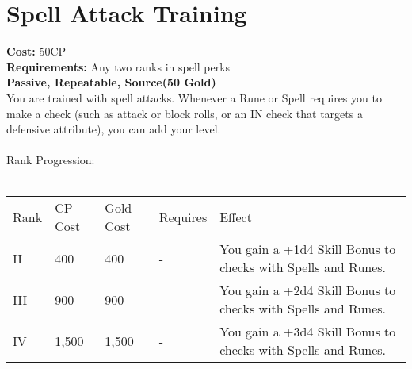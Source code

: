 \section{Spell Attack Training}\label{perk:spellAttackTraining}
\textbf{Cost:} 50CP\\
\textbf{Requirements:} Any two ranks in spell perks\\
\textbf{Passive, Repeatable, Source(50 Gold)}\\
You are trained with spell attacks.
Whenever a Rune or Spell requires you to make a check (such as attack or block rolls, or an IN check that targets a defensive attribute), you can add your level.\\
\\
Rank Progression:\\
\\
\begin{longtable}{l | l | l | l | p{9cm}}
	Rank & CP Cost & Gold Cost & Requires & Effect\\
	II & 400 & 400 & - & You gain a +1d4 Skill Bonus to checks with Spells and Runes.\\
	III & 900 & 900 & - & You gain a +2d4 Skill Bonus to checks with Spells and Runes.\\
	IV & 1,500 & 1,500 & - & You gain a +3d4 Skill Bonus to checks with Spells and Runes.\\
\end{longtable}
